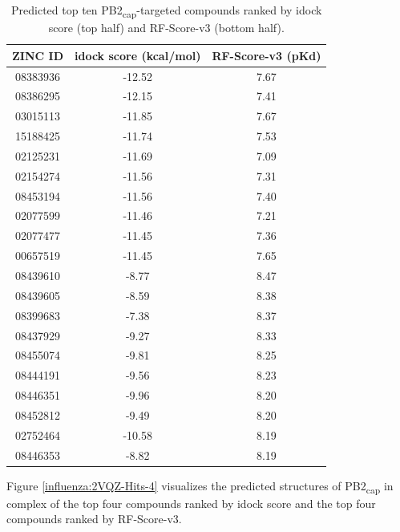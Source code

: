 \begin{table}
\caption{Predicted top ten PB2\textsubscript{cap}-targeted compounds ranked by idock score (top half) and RF-Score-v3 (bottom half).}
\label{influenza:2VQZ-Hits-10}
\begin{tabular}{ccc}
\hline
ZINC ID & idock score (kcal/mol) & RF-Score-v3 (pKd)\\
\hline
08383936 & -12.52 & 7.67\\
08386295 & -12.15 & 7.41\\
03015113 & -11.85 & 7.67\\
15188425 & -11.74 & 7.53\\
02125231 & -11.69 & 7.09\\
02154274 & -11.56 & 7.31\\
08453194 & -11.56 & 7.40\\
02077599 & -11.46 & 7.21\\
02077477 & -11.45 & 7.36\\
00657519 & -11.45 & 7.65\\
\hline
08439610 &  -8.77 & 8.47\\
08439605 &  -8.59 & 8.38\\
08399683 &  -7.38 & 8.37\\
08437929 &  -9.27 & 8.33\\
08455074 &  -9.81 & 8.25\\
08444191 &  -9.56 & 8.23\\
08446351 &  -9.96 & 8.20\\
08452812 &  -9.49 & 8.20\\
02752464 & -10.58 & 8.19\\
08446353 &  -8.82 & 8.19\\
\hline
\end{tabular}
\end{table}

Figure \ref{influenza:2VQZ-Hits-4} visualizes the predicted structures of PB2\textsubscript{cap} in complex of the top four compounds ranked by idock score and the top four compounds ranked by RF-Score-v3.


